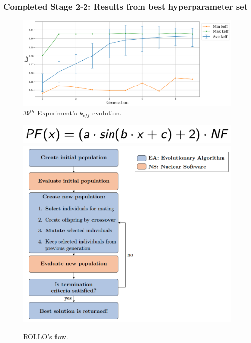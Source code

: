 \begin{frame}
    \frametitle{Completed Stage 2-2: Results from best hyperparameter set}
    \begin{minipage}[c]{0.6\textwidth}
    \begin{figure}[]
        \centering
        \includegraphics[width=\linewidth]{../docs/figures/keff_conv_39.png}
        \caption{39$^{th}$ Experiment's $k_{eff}$ evolution.}
    \end{figure}
\end{minipage}\hfill
\begin{minipage}[c]{0.4\textwidth}
    \centering
    \begin{figure}
        \includegraphics[width=\linewidth]{figures/equation.png}
        \vspace{0.5cm}
        \includegraphics[width=\linewidth]{figures/rollo-flow.png} 
        \caption{ROLLO's flow.}
    \end{figure}
\end{minipage}
\end{frame}


